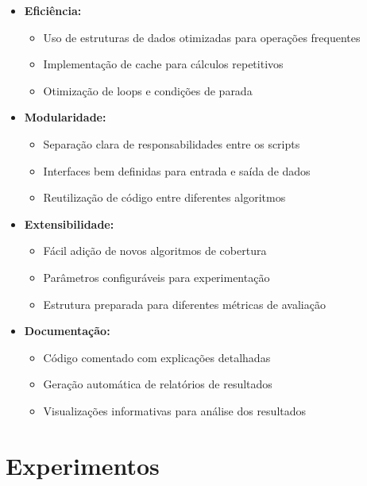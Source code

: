 \documentclass[12pt, a4paper]{report}
\begin{document}
\begin{itemize}
    \item \textbf{Eficiência:}
    \begin{itemize}
        \item Uso de estruturas de dados otimizadas para operações frequentes
        \item Implementação de cache para cálculos repetitivos
        \item Otimização de loops e condições de parada
    \end{itemize}
    
    \item \textbf{Modularidade:}
    \begin{itemize}
        \item Separação clara de responsabilidades entre os scripts
        \item Interfaces bem definidas para entrada e saída de dados
        \item Reutilização de código entre diferentes algoritmos
    \end{itemize}
    
    \item \textbf{Extensibilidade:}
    \begin{itemize}
        \item Fácil adição de novos algoritmos de cobertura
        \item Parâmetros configuráveis para experimentação
        \item Estrutura preparada para diferentes métricas de avaliação
    \end{itemize}
    
    \item \textbf{Documentação:}
    \begin{itemize}
        \item Código comentado com explicações detalhadas
        \item Geração automática de relatórios de resultados
        \item Visualizações informativas para análise dos resultados
    \end{itemize}
\end{itemize}

\chapter{Experimentos}
\end{document}
